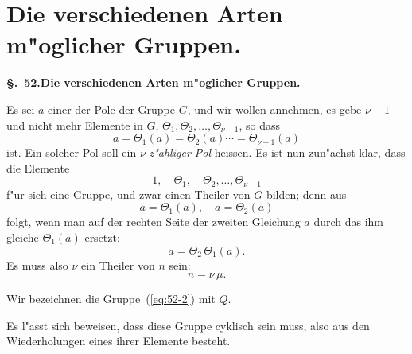 \documentclass[12pt,a4paper]{article}
\theoremstyle{definition}
\begin{document}
\section{Die verschiedenen Arten m"oglicher Gruppen.}\label{sec:52}

\noindent\textbf{\S.~52.}\quad\textbf{Die verschiedenen Arten m"oglicher Gruppen.}
\vspace{0.3cm}

Es sei $a$ einer der Pole der Gruppe $G$, und wir wollen annehmen, es gebe $\nu - 1$ und nicht mehr Elemente in $G$, $\Theta_1, \Theta_2, \ldots, \Theta_{\nu-1}$, so dass
\begin{equation}\label{eq:52-1}
a = \Theta_1(a) = \Theta_2(a) \cdots = \Theta_{\nu-1}(a)
\end{equation}
ist. Ein solcher Pol soll ein $\nu$-\emph{z"ahliger Pol} heissen. Es ist nun zun"achst klar, dass die Elemente
\begin{equation}\label{eq:52-2}
1, \quad \Theta_1, \quad \Theta_2, \ldots, \Theta_{\nu-1}
\end{equation}
f"ur sich eine Gruppe, und zwar einen Theiler von $G$ bilden; denn aus
\[
a = \Theta_1(a), \quad a = \Theta_2(a)
\]
folgt, wenn man auf der rechten Seite der zweiten Gleichung $a$ durch das ihm gleiche $\Theta_1(a)$ ersetzt:
\[
a = \Theta_2\,\Theta_1(a).
\]
Es muss also $\nu$ ein Theiler von $n$ sein:
\begin{equation}\label{eq:52-3}
n = \nu\,\mu.
\end{equation}

Wir bezeichnen die Gruppe~(\ref{eq:52-2}) mit $Q$.

Es l"asst sich beweisen, dass diese Gruppe cyklisch sein muss, also aus den Wiederholungen eines ihrer Elemente besteht.
\end{document}
